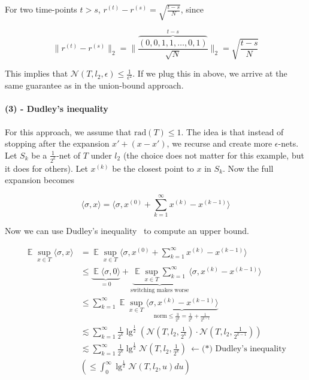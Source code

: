 \documentclass[11pt]{article}
\DeclareMathOperator*{\E}{\mathbb{E}}
\begin{document}
For two time-points $t > s$, $r^{(t)} - r^{(s)} = \sqrt{\frac{t-s}{N}}$, since

\begin{equation*}
\lVert r^{(t)} - r^{(s)} \rVert_2 = \lVert \frac{\overbrace{(0,0,1,1,\ldots, 0,1)}^{t-s}}{\sqrt{N}} \rVert_2 = \sqrt{\frac{t-s}{N}}
\end{equation*}

This implies that $\mathcal{N}(T, l_2, \epsilon) \leq \frac{1}{\epsilon^2}$. If we plug this in above, we arrive at the same guarantee as in the union-bound approach. 

\paragraph{(3) - Dudley's inequality} For this approach, we assume that $\text{rad}(T) \leq 1$. The idea is that instead of stopping after the expansion $x' + (x - x')$, we recurse and create more $\epsilon$-nets. Let $S_k$ be a $\frac{1}{2^k}$-net of $T$ under $l_2$ (the choice does not matter for this example, but it does for others). Let $x^{(k)}$ be the closest point to $x$ in $S_k$. Now the full expansion becomes

\begin{equation*}
\langle \sigma, x \rangle = \langle \sigma, x^{(0)} + \sum_{k=1}^\infty x^{(k)} - x^{(k-1)} \rangle
\end{equation*}

Now we can use Dudley's inequality~\cite{Dudley67} to compute an upper bound.

\begin{align*}
\E \sup_{x\in T} \langle \sigma, x \rangle &= \E \sup_{x\in T} \langle \sigma, x^{(0)} + \sum_{k=1}^\infty x^{(k)} - x^{(k-1)} \rangle \\
										   &\leq \underbrace{\E \langle \sigma, 0 \rangle}_{=0} + \underbrace{\E \sup_{x\in T} \sum_{k=1}^\infty}_{\text{switching makes worse}} \langle \sigma, x^{(k)} - x^{(k-1)} \rangle \\
                                           &\leq \sum_{k=1}^\infty \E \sup_{x\in T} \underbrace{\langle \sigma, x^{(k)} - x^{(k-1)} \rangle}_{\text{norm} \leq \frac{3}{2^k} = \frac{1}{2^k} + \frac{1}{2^{k-1}}} \\
                                           &\lesssim \sum_{k=1}^\infty \frac{1}{2^k} \lg^{\frac{1}{2}} (\mathcal{N}(T, l_2, \frac{1}{2^k}) \cdot \mathcal{N}(T, l_2, \frac{1}{2^{k-1}})) \\
                                           &\lesssim  \sum_{k=1}^\infty \frac{1}{2^k} \lg^{\frac{1}{2}} \mathcal{N}(T, l_2, \frac{1}{2^k})  \ \leftarrow \text{(*) Dudley's inequality} \\
                                           &\left( \leq \int_0^\infty \lg^{\frac{1}{2}} \mathcal{N}(T, l_2, u)du \right)
\end{align*}
\end{document}
